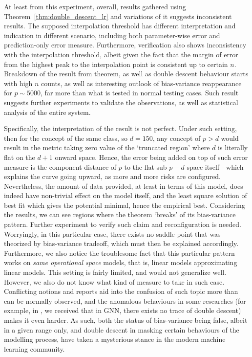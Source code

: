 At least from this experiment, overall, results gathered using Theorem~\ref{thm:double_descent_lr} and variations of it suggests inconsistent results. The supposed interpolation threshold has different interpretation and indication in different scenario, including both parameter-wise error and prediction-only error measure. Furthermore, verification also shows inconsistency with the interpolation threshold, albeit given the fact that the margin of error from the highest peak to the interpolation point is consistent up to certain $n$. Breakdown of the result from theorem, as well as double descent behaviour starts with high $n$ counts, as well as interesting outlook of bias-variance reappearance for $p\sim 5000$, far more than what is tested in normal testing cases. Such result suggests further experiments to validate the observations, as well as statistical analysis of the entire system. 

Specifically, the interpretation of the result is not perfect. Under such setting, then for the concept of the same class, so $d=150$, any concept of $p>d$ would result in the metric taking zero value of the `truncated region' where $d$ is literally flat on the $d+1$ onward space. Hence, the error being added on top of such error measure is the component distance of $p$ to the flat sub $p-d$ space itself - which explains the curve going upward, as more and more risks are configured. Nevertheless, the amount of data provided, at least in terms of this model, does indeed have non-trivial effect on the model itself, and the least square solution of best fit which gives the potential minimal, hence the empirical best. Considering the results, we can see regions where the theorem `breaks' of its bias-variance pattern. Further experiment to verify such claim and reconfiguration is needed. Worryingly, in this particular case, there exists no saddle point that was theorized by bias-variance tradeoff, which must then be explained accordingly. Furthermore, we also notice the troublesome fact that this particular pattern works on \textit{same operational space} models, that is, linear models approximating linear models. This setting is fairly limited, and would not generalize well. However, we also do not know what kind of measure to take in such case. Conflicting notions and reports aid into the confusion of such topic more than can be normally observed, and the anomalous behaviours in some researches (for example, in \cite{shi2024homophilymodulatesdoubledescent}, we received that in GNN, there exists no trace of double descent) makes it even harder. As such, both the status of bias-variance being false, albeit in a given range only, and double descent in masking certain behaviours of the modelling process, have taken a mysterious stance in the modern machine learning community.

